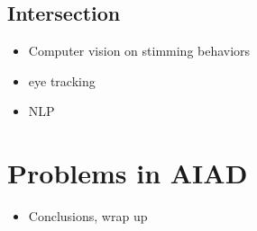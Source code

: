 \documentclass[twoside, letterpaper, twocolumn]{article}
\begin{document}
\subsection{Intersection}
\begin{itemize}
    \item Computer vision on stimming behaviors
    \item eye tracking
    \item NLP
\end{itemize}
\section{Problems in AIAD}
\begin{itemize}
    \item Conclusions, wrap up
\end{itemize}
\end{document}
